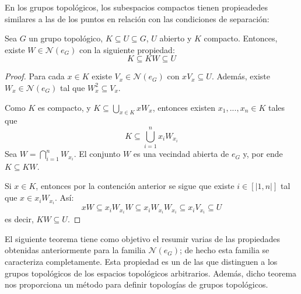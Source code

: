\documentclass[12pt]{report}
\theoremstyle{largebreak}
\newcommand{\N}[1]{\ensuremath{\mathscr{N}(#1)}}
\newcommand{\natint}[1]{\ensuremath{\left[\big|#1\big|\right]}}
\begin{document}
    En los grupos topológicos, los subespacios compactos tienen propieadedes similares a las de los puntos en relación con las condiciones de separación:

    \begin{theor}
        Sea $G$ un grupo topológico, $K\subseteq U\subseteq G$, $U$ abierto y $K$ compacto. Entonces, existe $W\in\N{e_G}$ con la siguiente propiedad:
        \begin{equation*}
            K\subseteq KW\subseteq U
        \end{equation*}
    \end{theor}

    \begin{proof}
        Para cada $x\in K$ existe $V_x\in\N{e_G}$ con $xV_x\subseteq U$. Además, existe $W_x\in\N{e_G}$ tal que $W_x^2\subseteq V_x$.

        Como $K$ es compacto, y $K\subseteq\bigcup_{x\in K}xW_x$, entonces existen $x_1,...,x_n\in K$ tales que
        \begin{equation*}
            K\subseteq\bigcup_{i=1}^nx_iW_{x_i}
        \end{equation*}
        Sea $W=\bigcap_{i=1}^nW_{x_i}$. El conjunto $W$ es una vecindad abierta de $e_G$ y, por ende $K\subseteq KW$.

        Si $x\in K$, entonces por la contención anterior se sigue que existe $i\in\natint{1,n}$ tal que $x\in x_iW_{x_i}$. Así:
        \begin{equation*}
            xW\subseteq x_iW_{x_i}W\subseteq x_iW_{x_i}W_{x_i}\subseteq x_iV_{x_i}\subseteq U
        \end{equation*}
        es decir, $KW\subseteq U$.
    \end{proof}

    El siguiente teorema tiene como objetivo el resumir varias de las propiedades obtenidas anteriormente para la familia $\N{e_G}$; de hecho esta familia se caracteriza completamente. Esta propiedad es un de las que distinguen a los grupos topológicos de los espacios topológicos arbitrarios. Además, dicho teorema nos proporciona un método para definir topologías de grupos topológicos.
\end{document}
